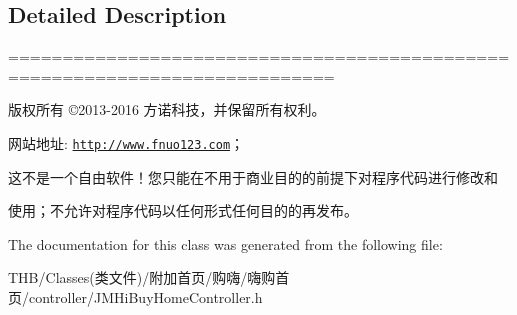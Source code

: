 \subsection{Detailed Description}
============================================================================

版权所有 ©2013-\/2016 方诺科技，并保留所有权利。

网站地址\+: \href{http://www.fnuo123.com}{\tt http\+://www.\+fnuo123.\+com}； 



这不是一个自由软件！您只能在不用于商业目的的前提下对程序代码进行修改和

使用；不允许对程序代码以任何形式任何目的的再发布。 

 

The documentation for this class was generated from the following file\+:\begin{DoxyCompactItemize}
\item 
T\+H\+B/\+Classes(类文件)/附加首页/购嗨/嗨购首页/controller/J\+M\+Hi\+Buy\+Home\+Controller.\+h\end{DoxyCompactItemize}
